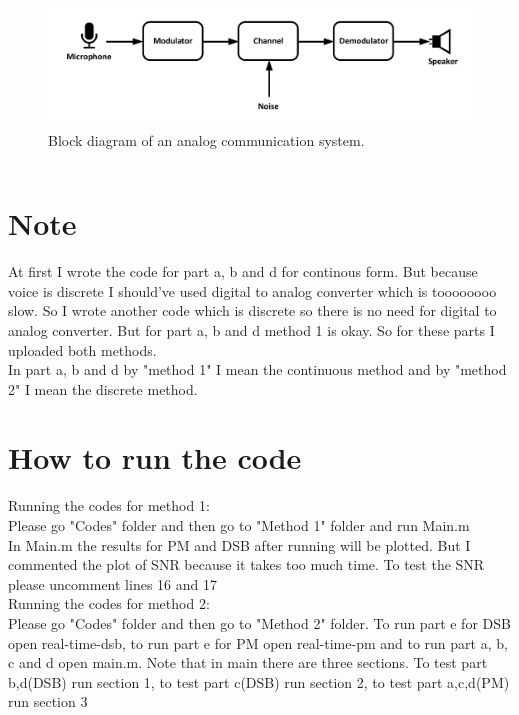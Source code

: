 \documentclass[11pt]{article}
\begin{document}



\begin{question}

\begin{figure}[h]
\centering
\includegraphics[scale=0.8]{Fig/model.pdf}
\caption{Block diagram of an analog communication system.}\label{fig:model}
\end{figure}

$$$$
\section*{Note}
At first I wrote the code for part a, b and d for continous form. But because voice is discrete I should've used digital to analog converter which is toooooooo slow. So I wrote another code which is discrete so there is no need for digital to analog converter. But for part a, b and d method 1 is okay. So for these parts I uploaded both methods. \\
In part a, b and d by "method 1" I mean the continuous method and by "method 2" I mean the discrete method.
$$$$
\section*{How to run the code}
Running the codes for method 1: \\
Please go "Codes" folder and then go to "Method 1" folder and run Main.m\\
In Main.m the results for PM and DSB after running will be plotted. But I commented the plot of SNR because it takes too much time. To test the SNR please uncomment lines 16 and 17\\
Running the codes for method 2: \\
Please go "Codes" folder and then go to "Method 2" folder. To run part e for DSB open real-time-dsb, to run part e for PM open real-time-pm and to run part a, b, c and d open main.m. Note that in main there are three sections. To test part b,d(DSB) run section 1, to test part c(DSB) run section 2, to test part a,c,d(PM) run section 3


\end{question}
\end{document}
